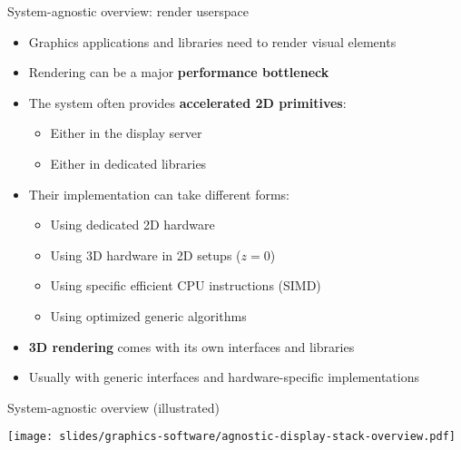 \begin{frame}{System-agnostic overview: render userspace}
  \begin{itemize}
  \item Graphics applications and libraries need to render visual elements
  \item Rendering can be a major \textbf{performance bottleneck}
  \item The system often provides \textbf{accelerated 2D primitives}:
    \begin{itemize}
    \item Either in the display server
    \item Either in dedicated libraries
    \end{itemize}
  \item Their implementation can take different forms:
    \begin{itemize}
    \item Using dedicated 2D hardware
    \item Using 3D hardware in 2D setups (\(z = 0\))
    \item Using specific efficient CPU instructions (SIMD)
    \item Using optimized generic algorithms
    \end{itemize}
  \item \textbf{3D rendering} comes with its own interfaces and libraries
  \item Usually with generic interfaces and hardware-specific implementations
  \end{itemize}
\end{frame}

\begin{frame}{System-agnostic overview (illustrated)}
  \begin{center}
  \texttt{[image: slides/graphics-software/agnostic-display-stack-overview.pdf]}
  \end{center}
\end{frame}


